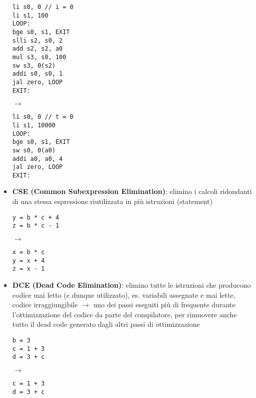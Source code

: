 \begin{itemize}
    \begin{minipage}[c]{.4\textwidth}
      \begin{lstlisting}
li s0, 0 // i = 0
li s1, 100
LOOP:
bge s0, s1, EXIT
slli s2, s0, 2
add s2, s2, a0
mul s3, s0, 100
sw s3, 0(s2)
addi s0, s0, 1
jal zero, LOOP
EXIT:\end{lstlisting} 
      \end{minipage}
      \hfill
      $\rightarrow$
      \hfill
      \begin{minipage}[c]{.4\textwidth}
        \begin{lstlisting}
li s0, 0 // t = 0
li s1, 10000
LOOP:
bge s0, s1, EXIT
sw s0, 0(a0)
addi a0, a0, 4
jal zero, LOOP
EXIT:\end{lstlisting}
      \end{minipage}

    \item \textbf{CSE (Common Subexpression Elimination)}: elimino i calcoli ridondanti di una stessa espressione riutilizzata in pi\`u istruzioni (statement)\\
      \begin{minipage}[c]{.4\textwidth}
        \begin{lstlisting}
y = b * c + 4
z = b * c - 1\end{lstlisting}
      \end{minipage}
      \hfill $\rightarrow$ \hfill
      \begin{minipage}[c]{.4\textwidth}
        \begin{lstlisting}
x = b * c
y = x + 4
z = x - 1\end{lstlisting}
      \end{minipage}
    \item \textbf{DCE (Dead Code Elimination)}: elimino tutte le istruzioni che producono codice mai letto (e dunque utilizzato), es. variabili assegnate e mai lette, codice irraggiungibile $\rightarrow$ uno dei passi eseguiti pi\`u di frequente durante l'ottimizzazione del codice da parte del compilatore, per rimuovere anche tutto il dead code generato dagli altri passi di ottimizzazione\vspace{.5em}\\
      \begin{minipage}[c]{.4\textwidth}
        \begin{lstlisting}
b = 3
c = 1 + 3
d = 3 + c\end{lstlisting}
      \end{minipage}
      \hfill $\rightarrow$ \hfill
      \begin{minipage}[c]{.4\textwidth}
        \begin{lstlisting}
c = 1 + 3
d = 3 + c\end{lstlisting}
      \end{minipage}


\end{itemize}

